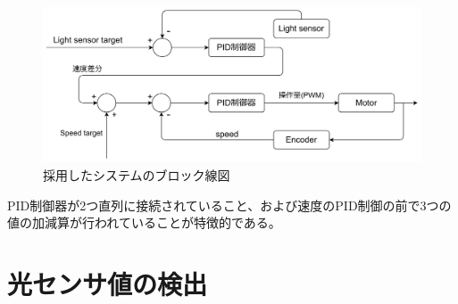 \documentclass{ltjsreport}
\begin{document}
\begin{figure}[tbh]
  \centering
  \includegraphics[keepaspectratio, scale=0.05]
       {img/block_line.drawio.png}
  \caption{採用したシステムのブロック線図}
  \label{fig:blockline}
 \end{figure}

PID制御器が2つ直列に接続されていること、および速度のPID制御の前で3つの値の加減算が行われていることが特徴的である。


\section{光センサ値の検出}
\end{document}
